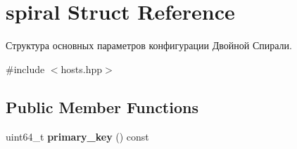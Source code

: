 \hypertarget{structspiral}{}\section{spiral Struct Reference}
\label{structspiral}


Структура основных параметров конфигурации Двойной Спирали.  




{\ttfamily \#include $<$hosts.\+hpp$>$}

\subsection*{Public Member Functions}
\begin{DoxyCompactItemize}
\item 
\mbox{\label{structspiral_afaf00204ab791522487a8498110136e3}} 
uint64\+\_\+t {\bfseries primary\+\_\+key} () const
\end{DoxyCompactItemize}

